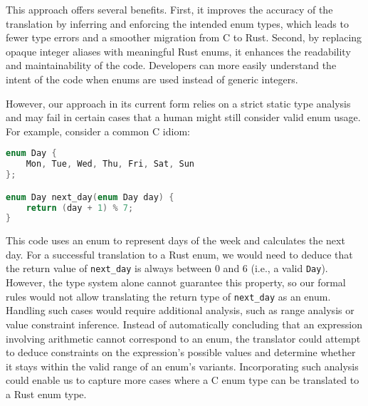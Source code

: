 \documentclass[10pt,conference]{IEEEtran}
\begin{document}
This approach offers several benefits. First, it improves the accuracy of the translation by inferring and enforcing the intended enum types, which leads to fewer type errors and a smoother migration from C to Rust. Second, by replacing opaque integer aliases with meaningful Rust enums, it enhances the readability and maintainability of the code. Developers can more easily understand the intent of the code when enums are used instead of generic integers.

However, our approach in its current form relies on a strict static type analysis and may fail in certain cases that a human might still consider valid enum usage. For example, consider a common C idiom:

\begin{lstlisting}[language=C]
enum Day {
    Mon, Tue, Wed, Thu, Fri, Sat, Sun
};

enum Day next_day(enum Day day) {
    return (day + 1) % 7;
}
\end{lstlisting}

This code uses an enum to represent days of the week and calculates the next day. For a successful translation to a Rust enum, we would need to deduce that the return value of \texttt{next\_day} is always between 0 and 6 (i.e., a valid \texttt{Day}). However, the type system alone cannot guarantee this property, so our formal rules would not allow translating the return type of \texttt{next\_day} as an enum. Handling such cases would require additional analysis, such as range analysis or value constraint inference. Instead of automatically concluding that an expression involving arithmetic cannot correspond to an enum, the translator could attempt to deduce constraints on the expression's possible values and determine whether it stays within the valid range of an enum's variants. Incorporating such analysis could enable us to capture more cases where a C enum type can be translated to a Rust enum type.
\end{document}
